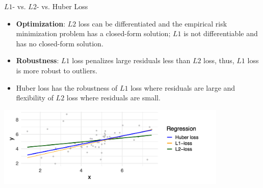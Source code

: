 \begin{vbframe}{$L1$- vs. $L2$- vs. Huber Loss}
\begin{itemize}
\item \textbf{Optimization}: $L2$ loss can be differentiated and the empirical risk minimization problem has a closed-form solution; $L1$ is not differentiable and has no closed-form solution.
\item \textbf{Robustness}: $L1$ loss penalizes large residuals less than $L2$ loss, thus, $L1$ loss is more robust to outliers.
\item Huber loss has the robustness of $L1$ loss where residuals are large and flexibility of $L2$ loss where residuals are small.
\end{itemize}

\vspace*{0.1cm}
\begin{center}
\includegraphics[width = 11cm ]{figure_man/different_losses.png}
\end{center}

\end{vbframe}



\endlecture


